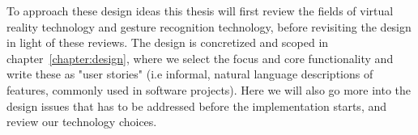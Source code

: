 To approach these design ideas this thesis will first review the fields of virtual reality technology and gesture recognition technology, before revisiting the design in light
of these reviews. The design is concretized and scoped in chapter~\vref{chapter:design}, where we select the focus and core functionality and write these as 
"user stories" (i.e informal, natural language descriptions of features, commonly used in software projects). Here we will also go more into the design issues that has to be
addressed before the implementation starts, and review our technology choices.  






